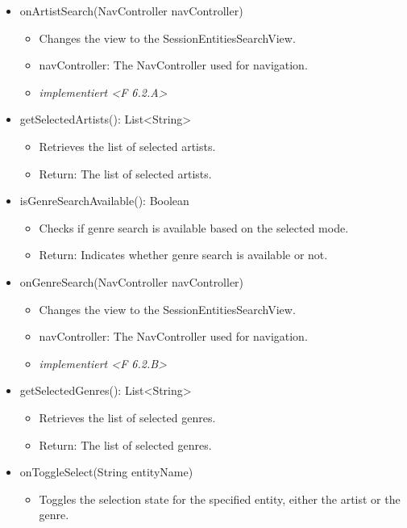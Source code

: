 \documentclass[oneside, ngerman]{sdqtechreport}
\begin{document}
\begin{itemize}
\begin{itemize}
        \end{itemize}
    \item onArtistSearch(NavController navController)
        \begin{itemize}
            \item Changes the view to the SessionEntitiesSearchView.
            \item navController: The NavController used for navigation.
            \item \textit{implementiert <F 6.2.A>}
        \end{itemize}
    \item getSelectedArtists(): List<String>
        \begin{itemize}
            \item Retrieves the list of selected artists.
            \item Return: The list of selected artists.
        \end{itemize}
    \item isGenreSearchAvailable(): Boolean
        \begin{itemize}
            \item Checks if genre search is available based on the selected mode.
            \item Return: Indicates whether genre search is available or not.
        \end{itemize}
    \item onGenreSearch(NavController navController)
        \begin{itemize}
            \item Changes the view to the SessionEntitiesSearchView.
            \item navController: The NavController used for navigation.
            \item \textit{implementiert <F 6.2.B>}
        \end{itemize}
    \item getSelectedGenres(): List<String>
        \begin{itemize}
            \item Retrieves the list of selected genres.
            \item Return: The list of selected genres.
        \end{itemize}
    \item onToggleSelect(String entityName)
        \begin{itemize}
            \item Toggles the selection state for the specified entity, either the artist or the genre.

\end{itemize}
\end{itemize}
\end{document}
